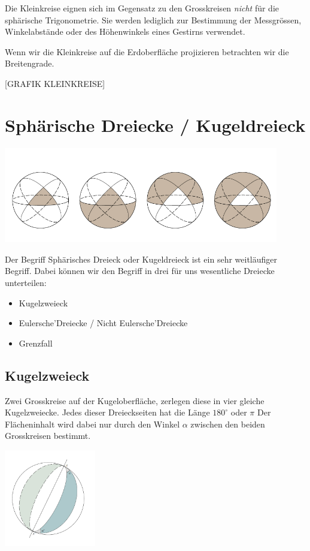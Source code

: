 \begin{refsection}
Die Kleinkreise eignen sich im Gegensatz zu den Grosskreisen \textit{nicht} für die sphärische Trigonometrie. 
Sie werden lediglich zur Bestimmung der Messgrössen, Winkelabstände oder des Höhenwinkels eines Gestirns verwendet. 

Wenn wir die Kleinkreise auf die Erdoberfläche projizieren betrachten wir die Breitengrade.

[GRAFIK KLEINKREISE]


\section{Sphärische Dreiecke / Kugeldreieck}

\begin{center}
        \includegraphics[width=0.9\textwidth]{kugel/Dreieckarten.jpg}
\end{center}

Der Begriff Sphärisches Dreieck oder Kugeldreieck ist ein sehr weitläufiger Begriff. 
Dabei können wir den Begriff in drei für uns wesentliche Dreiecke unterteilen:

\begin{itemize}
\item Kugelzweieck
\item Eulersche’Dreiecke / Nicht Eulersche’Dreiecke
\item Grenzfall
\end{itemize}

\subsection{Kugelzweieck}

Zwei Grosskreise auf der Kugeloberfläche, zerlegen diese in vier gleiche Kugelzweiecke. 
Jedes dieser Dreieckseiten hat die Länge
$180^{\circ}$ oder $\pi$
Der Flächeninhalt wird dabei nur durch den Winkel $\alpha$ zwischen den beiden Grosskreisen bestimmt.

\begin{center}
        \includegraphics[width=0.3\textwidth]{kugel/Zweieck.jpg}
\end{center}


\end{refsection}
